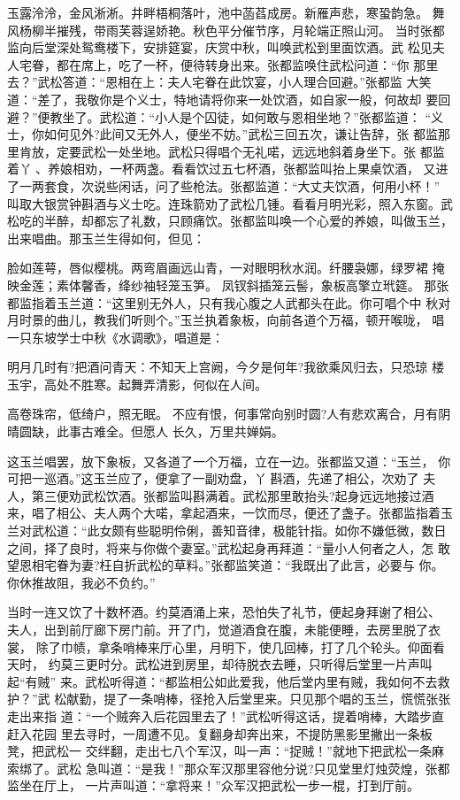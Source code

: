 玉露泠泠，金风淅淅。井畔梧桐落叶，池中菡萏成房。新雁声悲，寒蛩韵急。
舞风杨柳半摧残，带雨芙蓉逞娇艳。秋色平分催节序，月轮端正照山河。
当时张都监向后堂深处鸳鸯楼下，安排筵宴，庆赏中秋，叫唤武松到里面饮酒。武
松见夫人宅眷，都在席上，吃了一杯，便待转身出来。张都监唤住武松问道：“你
那里去？”武松答道：“恩相在上：夫人宅眷在此饮宴，小人理合回避。”张都监
大笑道：“差了，我敬你是个义士，特地请将你来一处饮酒，如自家一般，何故却
要回避？”便教坐了。武松道：“小人是个囚徒，如何敢与恩相坐地？”张都监道：
“义士，你如何见外?此间又无外人，便坐不妨。”武松三回五次，谦让告辞，张
都监那里肯放，定要武松一处坐地。武松只得唱个无礼喏，远远地斜着身坐下。张
都监着丫、养娘相劝，一杯两盏。看看饮过五七杯酒，张都监叫抬上果桌饮酒，
又进了一两套食，次说些闲话，问了些枪法。张都监道：“大丈夫饮酒，何用小杯！”
叫取大银赏钟斟酒与义士吃。连珠箭劝了武松几锺。看看月明光彩，照入东窗。武
松吃的半醉，却都忘了礼数，只顾痛饮。张都监叫唤一个心爱的养娘，叫做玉兰，
出来唱曲。那玉兰生得如何，但见：

脸如莲萼，唇似樱桃。两弯眉画远山青，一对眼明秋水润。纤腰袅娜，绿罗裙
掩映金莲；素体馨香，绛纱袖轻笼玉笋。
凤钗斜插笼云髻，象板高擎立玳筵。
那张都监指着玉兰道：“这里别无外人，只有我心腹之人武都头在此。你可唱个中
秋对月时景的曲儿，教我们听则个。”玉兰执着象板，向前各道个万福，顿开喉咙，
唱一只东坡学士中秋《水调歌》，唱道是：

明月几时有?把酒问青天：不知天上宫阙，今夕是何年?我欲乘风归去，只恐琼
楼玉宇，高处不胜寒。起舞弄清影，何似在人间。

高卷珠帘，低绮户，照无眠。
不应有恨，何事常向别时圆?人有悲欢离合，月有阴晴圆缺，此事古难全。但愿人
长久，万里共婵娟。

这玉兰唱罢，放下象板，又各道了一个万福，立在一边。张都监又道：“玉兰，
你可把一巡酒。”这玉兰应了，便拿了一副劝盘，丫斟酒，先递了相公，次劝了
夫人，第三便劝武松饮酒。张都监叫斟满着。武松那里敢抬头?起身远远地接过酒
来，唱了相公、夫人两个大喏，拿起酒来，一饮而尽，便还了盏子。张都监指着玉
兰对武松道：“此女颇有些聪明伶俐，善知音律，极能针指。如你不嫌低微，数日
之间，择了良时，将来与你做个妻室。”武松起身再拜道：“量小人何者之人，怎
敢望恩相宅眷为妻?枉自折武松的草料。”张都监笑道：“我既出了此言，必要与
你。你休推故阻，我必不负约。”

当时一连又饮了十数杯酒。约莫酒涌上来，恐怕失了礼节，便起身拜谢了相公、
夫人，出到前厅廊下房门前。开了门，觉道酒食在腹，未能便睡，去房里脱了衣裳，
除了巾帻，拿条哨棒来厅心里，月明下，使几回棒，打了几个轮头。仰面看天时，
约莫三更时分。武松进到房里，却待脱衣去睡，只听得后堂里一片声叫起“有贼”
来。武松听得道：“都监相公如此爱我，他后堂内里有贼，我如何不去救护？”武
松献勤，提了一条哨棒，径抢入后堂里来。只见那个唱的玉兰，慌慌张张走出来指
道：“一个贼奔入后花园里去了！”武松听得这话，提着哨棒，大踏步直赶入花园
里去寻时，一周遭不见。复翻身却奔出来，不提防黑影里撇出一条板凳，把武松一
交绊翻，走出七八个军汉，叫一声：“捉贼！”就地下把武松一条麻索绑了。武松
急叫道：“是我！”那众军汉那里容他分说?只见堂里灯烛荧煌，张都监坐在厅上，
一片声叫道：“拿将来！”众军汉把武松一步一棍，打到厅前。

